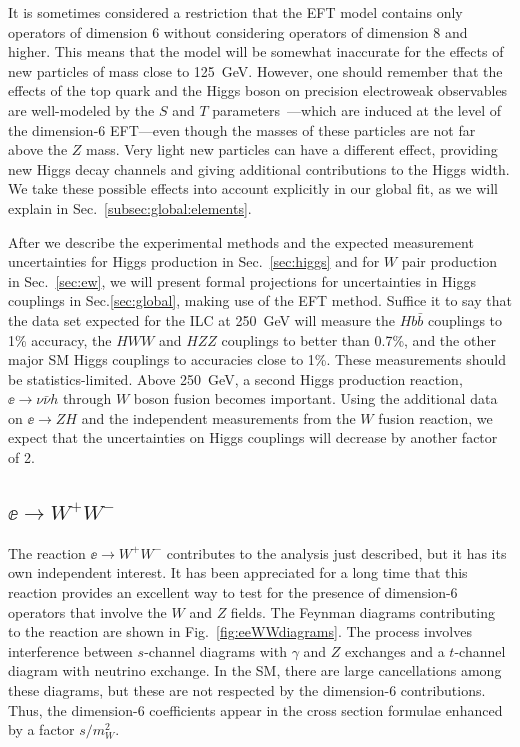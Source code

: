 It is sometimes considered a restriction that the EFT model contains only operators of dimension 6 without considering operators of dimension 8 and higher.    This means that the model will be somewhat inaccurate for the effects of new particles of mass close to 125~GeV.  However, one should remember that the effects of the top quark and the Higgs boson on precision electroweak observables are well-modeled by the $S$ and $T$ parameters~\cite{Peskin:1990zt}---which are induced at the level of the dimension-6 EFT---even though the masses of these particles are not far above the $Z$ mass.   Very light new particles can have a different effect, providing new Higgs decay channels and giving additional contributions to the Higgs width.  We take these possible effects into account explicitly in our global fit, as we will explain in Sec.~\ref{subsec:global:elements}.

After we describe the experimental methods and the expected measurement uncertainties for Higgs production in  Sec.~\ref{sec:higgs} and for $W$ pair production in Sec.~\ref{sec:ew},  we will present formal  projections for uncertainties in 
Higgs couplings in Sec.\ref{sec:global}, making use of the EFT  method.  Suffice it to say that the data set expected for the ILC at 250~GeV will  measure the $Hb\bar b$ couplings to 1\% accuracy, the $HWW$ and $HZZ$ couplings to better than 0.7\%, and the other 
major SM Higgs couplings to accuracies close to 1\%.    These measurements should be 
statistics-limited.  Above 250~GeV, a second Higgs production reaction, $\ee\to \nu\bar\nu h$ through $W$ boson fusion becomes important.  Using the additional data on $\ee\to ZH$ and the independent measurements from the $W$ fusion reaction, we expect that the uncertainties on Higgs couplings will decrease by another factor of 2. 


\subsection{$\ee \to W^+W^-$}
\label{subsec:phys_WW}
The reaction $\ee\to W^+W^-$ contributes to the analysis just described, but it has its own independent interest.  It has been appreciated for  a long time that this reaction provides an excellent way to test for the presence of dimension-6 operators that involve the $W$ and $Z$ fields.   The Feynman diagrams contributing to the reaction are shown in Fig.~\ref{fig:eeWWdiagrams}.   The process involves interference between $s$-channel diagrams with $\gamma$ and $Z$ exchanges and a $t$-channel diagram with neutrino exchange.  In the SM, there are large cancellations among these diagrams, but these are not respected by the dimension-6 contributions.   Thus, the dimension-6 coefficients appear in the cross section formulae enhanced by a factor $s/m_W^2$. 

